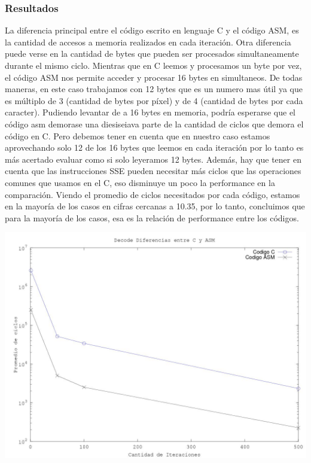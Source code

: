 \subsubsection{Resultados}
La diferencia principal entre el c\'odigo escrito en lenguaje C y el c\'odigo ASM, es la cantidad de accesos a memoria realizados en cada iteraci\'on. Otra diferencia puede verse en la cantidad de bytes que pueden ser procesados simultaneamente durante el mismo ciclo. Mientras que en C leemos y procesamos un byte por vez, el c\'odigo ASM nos permite acceder y procesar 16 bytes en simultaneos. De todas maneras, en este caso trabajamos con 12 bytes que es un numero mas \'util ya que es m\'ultiplo de 3 (cantidad de bytes por p\'ixel)  y de 4 (cantidad de bytes por cada caracter).\newline
Pudiendo levantar de a 16 bytes en memoria, podr\'ia esperarse que el c\'odigo asm demorase una diesiseiava parte de la cantidad de ciclos que demora el c\'odigo en C. Pero debemos tener en cuenta que en nuestro caso estamos aprovechando solo 12 de los 16 bytes que leemos en cada iteraci\'on por lo tanto es más acertado evaluar como si solo leyeramos 12 bytes. Adem\'as, hay que tener en cuenta que las instrucciones SSE pueden necesitar más ciclos que las operaciones comunes que usamos en el C, eso disminuye un poco la performance en la comparación. Viendo el promedio de ciclos necesitados por cada c\'odigo, estamos en la mayor\'ia de los casos en cifras cercanas a 10.35, por lo tanto, concluimos que para la mayoría de los casos, esa es la relaci\'on de performance entre los códigos.
\newline

\includegraphics[scale=0.7]{imagenes/DecodeDiferencias.jpg}

